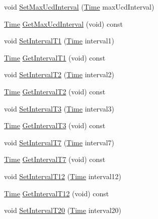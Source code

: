 \begin{DoxyCompactItemize}
\item 
void \hyperlink{classns3_1_1SubscriberStationNetDevice_afbb70fe7e08bd4230ee03312328fb1b6}{Set\+Max\+Ucd\+Interval} (\hyperlink{classns3_1_1Time}{Time} max\+Ucd\+Interval)
\item 
\hyperlink{classns3_1_1Time}{Time} \hyperlink{classns3_1_1SubscriberStationNetDevice_ad4c349a64630f649abfa8cf9dc12ad55}{Get\+Max\+Ucd\+Interval} (void) const 
\item 
void \hyperlink{classns3_1_1SubscriberStationNetDevice_a3d0eced821975da68d0182f96c17cd81}{Set\+Interval\+T1} (\hyperlink{classns3_1_1Time}{Time} interval1)
\item 
\hyperlink{classns3_1_1Time}{Time} \hyperlink{classns3_1_1SubscriberStationNetDevice_a40555412fa9dc77df354030168e0d662}{Get\+Interval\+T1} (void) const 
\item 
void \hyperlink{classns3_1_1SubscriberStationNetDevice_a9f483dc03d4994f3a6f302c7a1dc4ecd}{Set\+Interval\+T2} (\hyperlink{classns3_1_1Time}{Time} interval2)
\item 
\hyperlink{classns3_1_1Time}{Time} \hyperlink{classns3_1_1SubscriberStationNetDevice_a4ef793930cbb70ec9e49c0c8b7d992ae}{Get\+Interval\+T2} (void) const 
\item 
void \hyperlink{classns3_1_1SubscriberStationNetDevice_aa7a44e7812678c7ae922457c17121e64}{Set\+Interval\+T3} (\hyperlink{classns3_1_1Time}{Time} interval3)
\item 
\hyperlink{classns3_1_1Time}{Time} \hyperlink{classns3_1_1SubscriberStationNetDevice_a44d58fe9951838bf4cc43d10f676096c}{Get\+Interval\+T3} (void) const 
\item 
void \hyperlink{classns3_1_1SubscriberStationNetDevice_ac21986727dc13c0963002692260f15c3}{Set\+Interval\+T7} (\hyperlink{classns3_1_1Time}{Time} interval7)
\item 
\hyperlink{classns3_1_1Time}{Time} \hyperlink{classns3_1_1SubscriberStationNetDevice_a94cea1ae0e0b557a201822b5f1bf2fef}{Get\+Interval\+T7} (void) const 
\item 
void \hyperlink{classns3_1_1SubscriberStationNetDevice_aa766c01a50b7dead37cb7e8a8c125866}{Set\+Interval\+T12} (\hyperlink{classns3_1_1Time}{Time} interval12)
\item 
\hyperlink{classns3_1_1Time}{Time} \hyperlink{classns3_1_1SubscriberStationNetDevice_a2abfe5609632c7ca5ca9c8e05425983e}{Get\+Interval\+T12} (void) const 
\item 
void \hyperlink{classns3_1_1SubscriberStationNetDevice_a3632a6e8747c623d76a42ba04d1e2bff}{Set\+Interval\+T20} (\hyperlink{classns3_1_1Time}{Time} interval20)

\end{DoxyCompactItemize}
